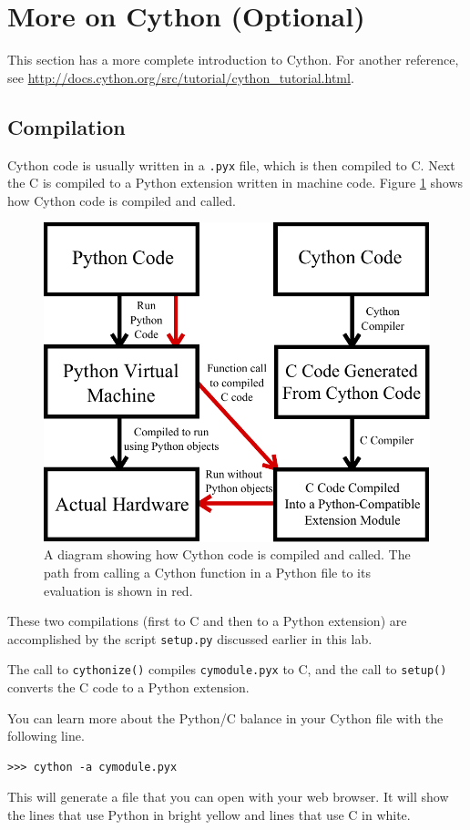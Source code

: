       
\section*{More on Cython (Optional)}
This section has a more complete introduction to Cython. 
For another reference, see \url{http://docs.cython.org/src/tutorial/cython_tutorial.html}.

\subsection*{Compilation}

Cython code is usually written in a \texttt{.pyx} file, which is then compiled to C.
Next the C is compiled to a Python extension written in machine code.
Figure \ref{cython:compilation} shows how Cython code is compiled and called.

\begin{figure}
\centering
\includegraphics[width=.7\textwidth]{compilation.pdf}
\caption{A diagram showing how Cython code is compiled and called.
The path from calling a Cython function in a Python file to its evaluation is shown in red.}
\label{cython:compilation}
\end{figure}

These two compilations (first to C and then to a Python extension) are accomplished by the script \texttt{setup.py} discussed earlier in this lab.

The call to \texttt{cythonize()} compiles \texttt{cymodule.pyx} to C, and the call to \texttt{setup()} converts the C code to a Python extension.

\begin{info}
You can learn more about the Python/C balance in your Cython file with the following line.
\begin{lstlisting}
>>> cython -a cymodule.pyx
\end{lstlisting}
This will generate a  file that you can open with your web browser.
It will show the lines that use Python in bright yellow and lines that use C in white.
\end{info}

